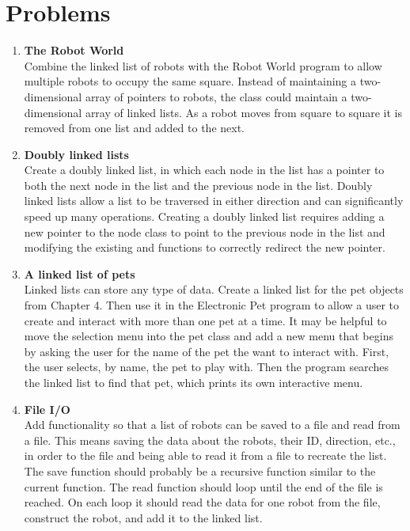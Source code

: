 \section{Problems}

\begin{enumerate}[{\bf 1.}]

\item {\bf The Robot World}\\
 Combine the linked list of robots with the Robot World program to allow multiple robots to occupy the same square.  Instead of maintaining a two-dimensional array of pointers to robots, the  class could maintain a two-dimensional array of linked lists.  As a robot moves from square to square it is removed from one list and added to the next.

\item {\bf Doubly linked lists}\\
 Create a doubly linked list, in which each node in the list has a pointer to both the next node in the list and the previous node in the list.  Doubly linked lists allow a list to be traversed in either direction and can significantly speed up many operations.  Creating a doubly linked list requires adding a new pointer to the node class to point to the previous node in the list and modifying the existing  and  functions to correctly redirect the new pointer.

\item {\bf A linked list of pets}\\
 Linked lists can store any type of data.  Create a linked list for the pet objects from Chapter 4.  Then use it in the Electronic Pet program to allow a user to create and interact with more than one pet at a time.  It may be helpful to move the selection menu into the pet class and add a new menu that begins by asking the user for the name of the pet the want to interact with.  First, the user selects, by name, the pet to play with.  Then the program searches the linked list to find that pet, which  prints its own interactive menu.  

\item {\bf File I/O}\\
Add functionality so that a list of robots can be saved to a file and read from a file.  This means saving the data about the robots, their ID, direction, etc., in order to the file and being able to read it from a file to recreate the list.  The save function should probably be a recursive function similar to the current  function.  The read function should loop until the end of the file is reached.  On each loop it should read the data for one robot from the file, construct the robot, and add it to the linked list.

\end{enumerate}